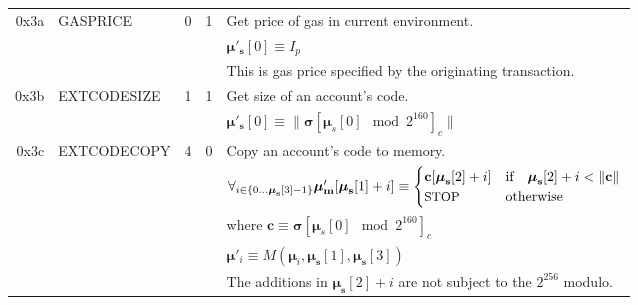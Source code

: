 \documentclass[9pt,oneside]{amsart}
\begin{document}
\begin{tabular*}{\columnwidth}[h]{rlrrl}
\midrule
0x3a & {\small GASPRICE} & 0 & 1 & Get price of gas in current environment. \\
&&&& $\boldsymbol{\mu}'_\mathbf{s}[0] \equiv I_p$ \\
&&&& This is gas price specified by the originating transaction.\\
\midrule
0x3b & {\small EXTCODESIZE} & 1 & 1 & Get size of an account's code. \\
&&&& $\boldsymbol{\mu}'_\mathbf{s}[0] \equiv \lVert \boldsymbol{\sigma}[\boldsymbol{\mu}_s[0] \mod 2^{160}]_c \rVert$ \\
\midrule
0x3c & {\small EXTCODECOPY} & 4 & 0 & Copy an account's code to memory. \\
&&&& $\forall_{i \in \{ 0 \dots \boldsymbol{\mu}_\mathbf{s}[3] - 1\} } \boldsymbol{\mu}'_\mathbf{m}[\boldsymbol{\mu}_\mathbf{s}[1] + i ] \equiv
\begin{cases} \mathbf{c}[\boldsymbol{\mu}_\mathbf{s}[2] + i] & \text{if} \quad \boldsymbol{\mu}_\mathbf{s}[2] + i < \lVert \mathbf{c} \rVert \\ \text{\small STOP} & \text{otherwise} \end{cases}$\\
&&&& where $\mathbf{c} \equiv \boldsymbol{\sigma}[\boldsymbol{\mu}_s[0] \mod 2^{160}]_c$ \\
&&&& $\boldsymbol{\mu}'_i \equiv M(\boldsymbol{\mu}_i, \boldsymbol{\mu}_\mathbf{s}[1], \boldsymbol{\mu}_\mathbf{s}[3])$ \\
&&&& The additions in $\boldsymbol{\mu}_\mathbf{s}[2] + i$ are not subject to the $2^{256}$ modulo. \\
\bottomrule
\end{tabular*}
\end{document}
